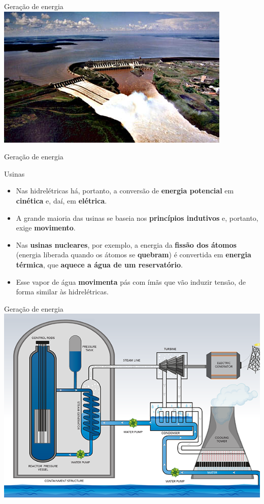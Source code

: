\begin{frame}{Geração de energia}
	\centering
	\includegraphics[width=1\linewidth]{Figuras/Ch03/fig2}
\end{frame}


\begin{frame}{Geração de energia}
	\begin{block}{Usinas}
		\begin{itemize}
			\item Nas hidrelétricas há, portanto, a conversão de \textbf{energia potencial} em \textbf{cinética} e, daí, em \textbf{elétrica}.
			\item A grande maioria das usinas se baseia nos \textbf{princípios indutivos} e, portanto, exige \textbf{movimento}.
			\item Nas \textbf{usinas nucleares}, por exemplo, a energia da \textbf{fissão dos átomos} (energia liberada quando os átomos se \textbf{quebram}) é convertida em \textbf{energia térmica}, que \textbf{aquece a água de um reservatório}.
			\item Esse vapor de água \textbf{movimenta} pás com ímãs que vão induzir tensão, de forma similar às hidrelétricas.
		\end{itemize}
	\end{block}
\end{frame}


\begin{frame}{Geração de energia}
	\centering
	\includegraphics[width=0.9\linewidth]{Figuras/Ch03/fig3}
\end{frame}


